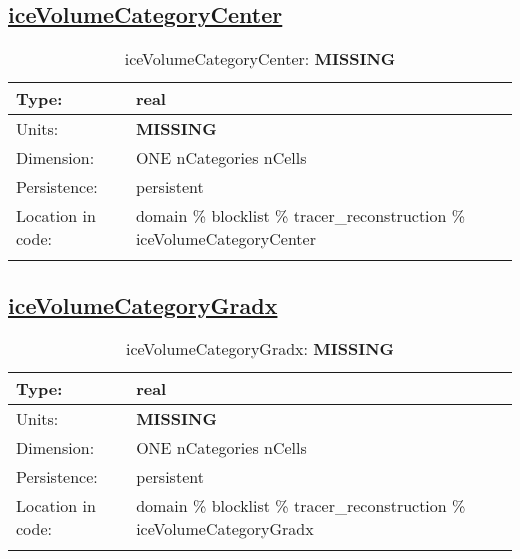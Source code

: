 \subsection[iceVolumeCategoryCenter]{\hyperref[sec:var_tab_tracer_reconstruction]{iceVolumeCategoryCenter}}
\label{subsec:var_sec_tracer_reconstruction_iceVolumeCategoryCenter}
\begin{center}
\begin{longtable}{| p{2.0in} | p{4.0in} |}
        \hline 
        Type: & real \\
        \hline 
        Units: & {\bf \color{red} MISSING} \\
        \hline 
        Dimension: & ONE nCategories nCells \\
        \hline 
        Persistence: & persistent \\
        \hline 
         Location in code: & domain \% blocklist \% tracer\_reconstruction \% iceVolumeCategoryCenter \\
         \hline 
    \caption{iceVolumeCategoryCenter: {\bf \color{red} MISSING}}
\end{longtable}
\end{center}
\subsection[iceVolumeCategoryGradx]{\hyperref[sec:var_tab_tracer_reconstruction]{iceVolumeCategoryGradx}}
\label{subsec:var_sec_tracer_reconstruction_iceVolumeCategoryGradx}
\begin{center}
\begin{longtable}{| p{2.0in} | p{4.0in} |}
        \hline 
        Type: & real \\
        \hline 
        Units: & {\bf \color{red} MISSING} \\
        \hline 
        Dimension: & ONE nCategories nCells \\
        \hline 
        Persistence: & persistent \\
        \hline 
         Location in code: & domain \% blocklist \% tracer\_reconstruction \% iceVolumeCategoryGradx \\
         \hline 
    \caption{iceVolumeCategoryGradx: {\bf \color{red} MISSING}}
\end{longtable}
\end{center}
